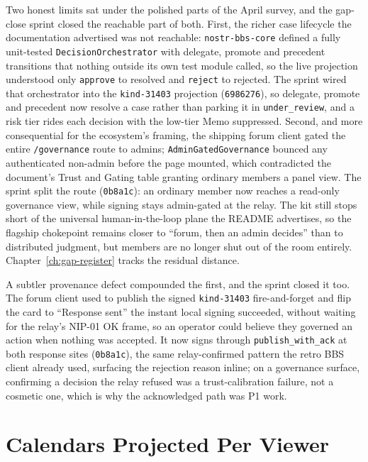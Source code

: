 Two honest limits sat under the polished parts of the April survey, and the gap-close sprint closed the reachable part of both. First, the richer case lifecycle the documentation advertised was not reachable: \texttt{nostr-bbs-core} defined a fully unit-tested \texttt{DecisionOrchestrator} with delegate, promote and precedent transitions that nothing outside its own test module called, so the live projection understood only \texttt{approve} to resolved and \texttt{reject} to rejected. The sprint wired that orchestrator into the \texttt{kind-31403} projection (\texttt{6986276}), so delegate, promote and precedent now resolve a case rather than parking it in \texttt{under\_review}, and a risk tier rides each decision with the low-tier Memo suppressed. Second, and more consequential for the ecosystem's framing, the shipping forum client gated the entire \texttt{/governance} route to admins; \texttt{AdminGatedGovernance} bounced any authenticated non-admin before the page mounted, which contradicted the document's Trust and Gating table granting ordinary members a panel view. The sprint split the route (\texttt{0b8a1c}): an ordinary member now reaches a read-only governance view, while signing stays admin-gated at the relay. The kit still stops short of the universal human-in-the-loop plane the README advertises, so the flagship chokepoint remains closer to ``forum, then an admin decides'' than to distributed judgment, but members are no longer shut out of the room entirely. Chapter~\ref{ch:gap-register} tracks the residual distance.

A subtler provenance defect compounded the first, and the sprint closed it too. The forum client used to publish the signed \texttt{kind-31403} fire-and-forget and flip the card to ``Response sent'' the instant local signing succeeded, without waiting for the relay's NIP-01 OK frame, so an operator could believe they governed an action when nothing was accepted. It now signs through \texttt{publish\_with\_ack} at both response sites (\texttt{0b8a1c}), the same relay-confirmed pattern the retro BBS client already used, surfacing the rejection reason inline; on a governance surface, confirming a decision the relay refused was a trust-calibration failure, not a cosmetic one, which is why the acknowledged path was P1 work.

\section{Calendars Projected Per Viewer}

